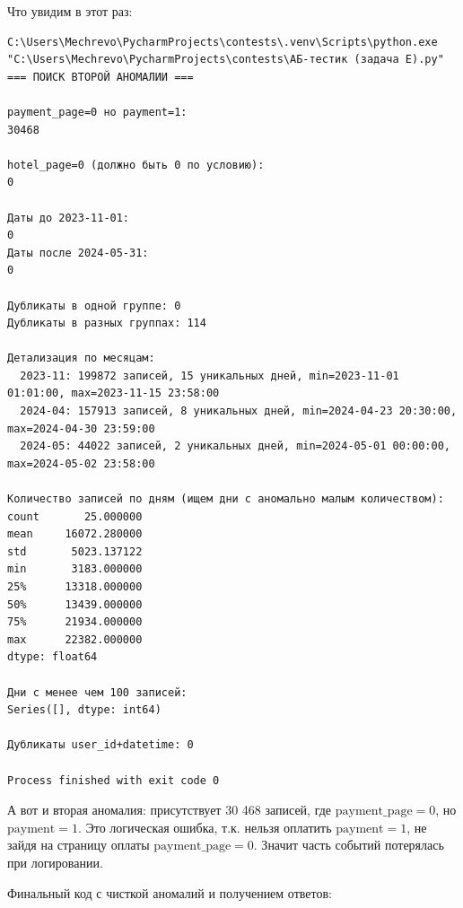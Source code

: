 \documentclass[pract]{SCWorks}
\begin{document}
Что увидим в этот раз:

\begin{Verbatim}[fontsize=\small, breaklines=true, breaksymbol={\tiny\ensuremath{\hookrightarrow}}]
C:\Users\Mechrevo\PycharmProjects\contests\.venv\Scripts\python.exe "C:\Users\Mechrevo\PycharmProjects\contests\АБ-тестик (задача E).py" 
=== ПОИСК ВТОРОЙ АНОМАЛИИ ===

payment_page=0 но payment=1:
30468

hotel_page=0 (должно быть 0 по условию):
0

Даты до 2023-11-01:
0
Даты после 2024-05-31:
0

Дубликаты в одной группе: 0
Дубликаты в разных группах: 114

Детализация по месяцам:
  2023-11: 199872 записей, 15 уникальных дней, min=2023-11-01 01:01:00, max=2023-11-15 23:58:00
  2024-04: 157913 записей, 8 уникальных дней, min=2024-04-23 20:30:00, max=2024-04-30 23:59:00
  2024-05: 44022 записей, 2 уникальных дней, min=2024-05-01 00:00:00, max=2024-05-02 23:58:00

Количество записей по дням (ищем дни с аномально малым количеством):
count       25.000000
mean     16072.280000
std       5023.137122
min       3183.000000
25%      13318.000000
50%      13439.000000
75%      21934.000000
max      22382.000000
dtype: float64

Дни с менее чем 100 записей:
Series([], dtype: int64)

Дубликаты user_id+datetime: 0

Process finished with exit code 0
\end{Verbatim}

А вот и вторая аномалия: присутствует 30 468 записей, где $\text{payment\_page} = 0$, но $\text{payment} = 1$.
Это логическая ошибка, т.к. нельзя оплатить $\text{payment} = 1$, не зайдя на страницу оплаты $\text{payment\_page} = 0$.
Значит часть событий потерялась при логировании.

Финальный код с чисткой аномалий и получением ответов:
\end{document}
